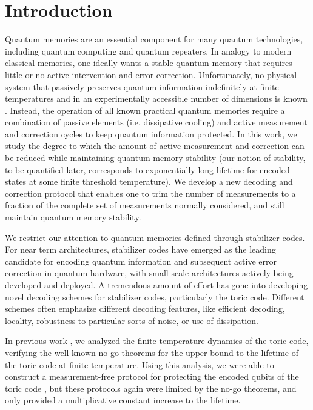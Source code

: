 \documentclass[twocolumn,superscriptaddress,aps,prb,floatfix]{revtex4-1}
\begin{document}
\section{Introduction}
\label{sec:Intro}
 Quantum memories are an essential component for many quantum technologies, including quantum computing and quantum repeaters. In analogy to modern classical memories, one ideally wants a stable quantum memory that requires little or no active intervention and error correction. Unfortunately, no physical system that passively preserves quantum information indefinitely at finite temperatures and in an experimentally accessible number of dimensions is known \cite{Terhal:2015ks}. Instead, the operation of all known practical quantum memories require a combination of passive elements (i.e. dissipative cooling) and active measurement and correction cycles to keep quantum information protected.  In this work, we study the degree to which the amount of active measurement and correction can be reduced while maintaining quantum memory stability (our notion of stability, to be quantified later, corresponds to exponentially long lifetime for encoded states at some finite threshold temperature). We develop a new decoding and correction protocol that enables one to trim the number of measurements to a fraction of the complete set of measurements normally considered, and still maintain quantum memory stability. 
 
 We restrict our attention to quantum memories defined through stabilizer codes. For near term architectures, stabilizer codes\cite{Gottesman98} have emerged as the leading candidate for encoding quantum information and subsequent active error correction in quantum hardware, with small scale architectures actively being developed and deployed\cite{all the stabilizers}.  A tremendous amount of effort has gone into developing novel decoding schemes for stabilizer codes, particularly the toric code.  Different schemes often emphasize different decoding features, like efficient decoding\cite{Kovalev2013,Wang2009,Duclos-Cianci2010}, locality\cite{Breuckmann2016,Torlai2016,Harrington2004,Herold2014}, robustness to particular sorts of noise\cite{Novais2013,Bombin2012,Wootton2015}, or use of dissipation\cite{Freeman2016,Hutter2012a,Hutter2014,Fujii2014,Pedrocchi2013,Pedrocchi2011,Chesi2010a,Chesi2010b,Hamma2009,Herdman2010, Weimer2010, Dengis2014, Kapit2015, Bardyn2015}.
 
 In previous work \cite{Freeman2014}, we analyzed the finite temperature dynamics of the toric code, verifying the well-known no-go theorems for the upper bound to the lifetime of the toric code at finite temperature\cite{Bravyi2009, Alicki2009a, Chesi2010b, Yoshida2011b, Hastings2011a, Landon-Cardinal2013, Temme2014, temme2015fast}.  Using this analysis, we were able to construct a measurement-free protocol for protecting the encoded qubits of the toric code \cite{Freeman2016}, but these protocols again were limited by the no-go theorems, and only provided a multiplicative constant increase to the lifetime.  
 
\end{document}
